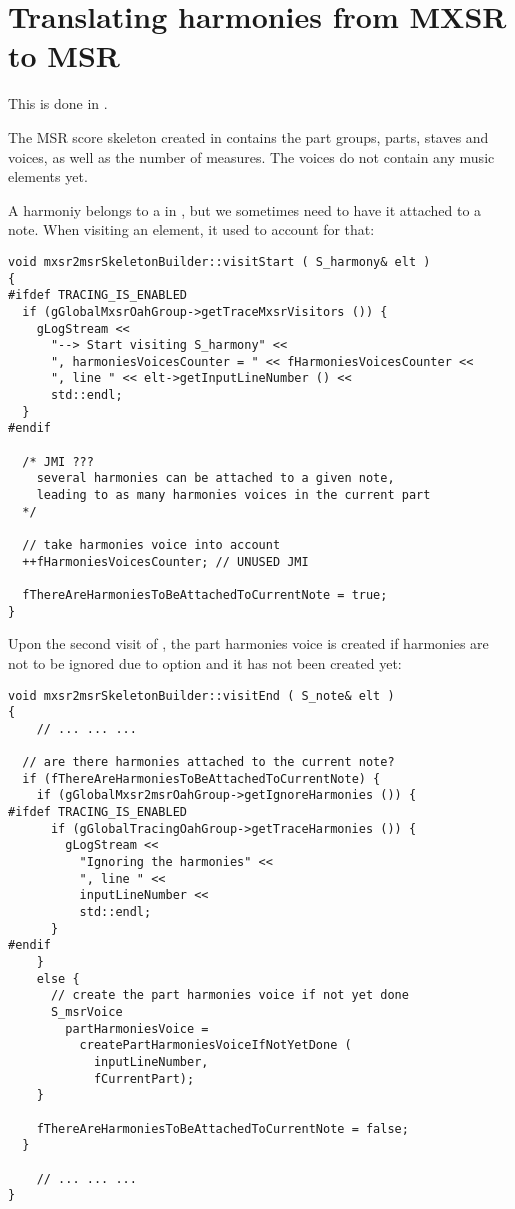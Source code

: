 \section{Translating harmonies from MXSR to MSR}

This is done in \mxsrToMsr{}.

The MSR score skeleton created in  contains the part groups, parts, staves and voices, as well as the number of measures. The voices do not contain any music elements yet.

A harmoniy belongs to a  in \mxml, but we sometimes need to have it attached to a note. When visiting an  element,  it used to account for that:%
\begin{lstlisting}[language=CPlusPlus]
void mxsr2msrSkeletonBuilder::visitStart ( S_harmony& elt )
{
#ifdef TRACING_IS_ENABLED
  if (gGlobalMxsrOahGroup->getTraceMxsrVisitors ()) {
    gLogStream <<
      "--> Start visiting S_harmony" <<
      ", harmoniesVoicesCounter = " << fHarmoniesVoicesCounter <<
      ", line " << elt->getInputLineNumber () <<
      std::endl;
  }
#endif

  /* JMI ???
    several harmonies can be attached to a given note,
    leading to as many harmonies voices in the current part
  */

  // take harmonies voice into account
  ++fHarmoniesVoicesCounter; // UNUSED JMI

  fThereAreHarmoniesToBeAttachedToCurrentNote = true;
}
\end{lstlisting}

Upon the second visit of , the part harmonies voice is created if harmonies are not to be ignored due to option  and it has not been created yet:
\begin{lstlisting}[language=CPlusPlus]
void mxsr2msrSkeletonBuilder::visitEnd ( S_note& elt )
{
	// ... ... ...

  // are there harmonies attached to the current note?
  if (fThereAreHarmoniesToBeAttachedToCurrentNote) {
    if (gGlobalMxsr2msrOahGroup->getIgnoreHarmonies ()) {
#ifdef TRACING_IS_ENABLED
      if (gGlobalTracingOahGroup->getTraceHarmonies ()) {
        gLogStream <<
          "Ignoring the harmonies" <<
          ", line " <<
          inputLineNumber <<
          std::endl;
      }
#endif
    }
    else {
      // create the part harmonies voice if not yet done
      S_msrVoice
        partHarmoniesVoice =
          createPartHarmoniesVoiceIfNotYetDone (
            inputLineNumber,
            fCurrentPart);
    }

    fThereAreHarmoniesToBeAttachedToCurrentNote = false;
  }

	// ... ... ...
}
\end{lstlisting}

